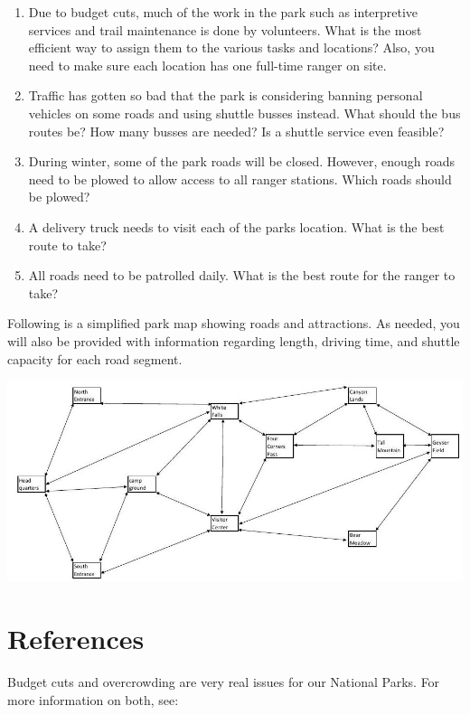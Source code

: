 \documentclass[10pt]{article}
\begin{document}
\begin{enumerate}
  \item Due to budget cuts, much of the work in the park such as interpretive services and trail maintenance is done by volunteers. What is the most efficient way to assign them to the various tasks and locations? Also, you need to make sure each location has one full-time ranger on site.

  \item Traffic has gotten so bad that the park is considering banning personal vehicles on some roads and using shuttle busses instead. What should the bus routes be? How many busses are needed? Is a shuttle service even feasible?

  \item During winter, some of the park roads will be closed. However, enough roads need to be plowed to allow access to all ranger stations. Which roads should be plowed?

  \item A delivery truck needs to visit each of the parks location. What is the best route to take?

  \item All roads need to be patrolled daily. What is the best route for the ranger to take?

\end{enumerate}
Following is a simplified park map showing roads and attractions. As needed, you will also be provided with information regarding length, driving time, and shuttle capacity for each road segment.

\includegraphics[max width=\textwidth]{2022_07_05_5945264bba2a5f6ba667g-41}

\section{References}
Budget cuts and overcrowding are very real issues for our National Parks. For more information on both, see:
\end{document}

